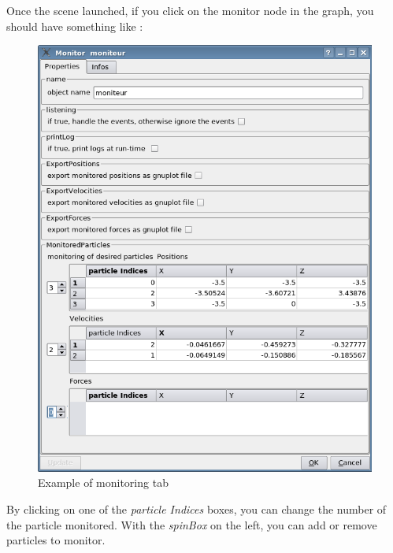 \documentclass[a4paper,10pt]{article}
\begin{document}
\begin{enumerate}
Once the scene launched, if you click on the monitor node in the graph, you should have something like :


	\begin{figure} [h]
	\includegraphics[scale=0.5] {QTableMonitor.png}
	\caption{Example of monitoring tab}
	\label{figure1}
	\end{figure}


By clicking on one of the \textit{particle Indices} boxes, you can change the number of the particle monitored.
With the \textit{spinBox} on the left, you can add or remove particles to monitor.





\end{enumerate}
\end{document}
